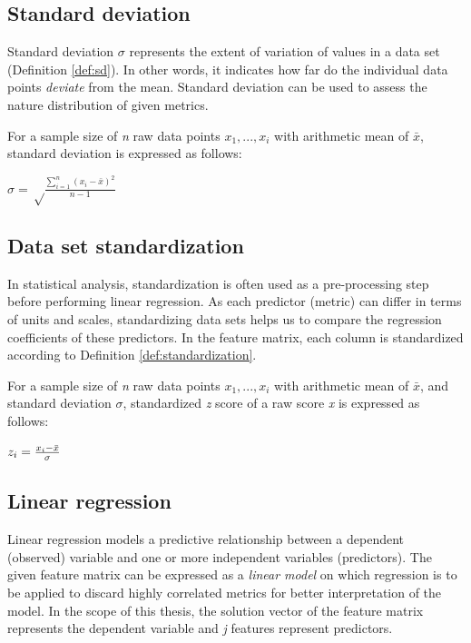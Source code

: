 \subsection*{Standard deviation}
Standard deviation $\sigma$ represents the extent of variation of values in a data set (Definition \ref{def:sd}). In other words, it indicates how far do the individual data points \textit{deviate} from the mean. Standard deviation can be used to assess the nature distribution of given metrics. 
\theoremstyle{definition}
\begin{definition}{For a sample size of \textit{n} raw data points \textit{$x_1,...,x_i$} with arithmetic mean of $\bar{x}$, standard deviation is expressed as follows:  }
\begin{center}\Large
$\sigma = \sqrt\frac{\sum\limits_{i=1}^{n}(x_i - \bar{x})^2} {n - 1}$
\label{def:sd}
\end{center}
\end{definition}

\subsection*{Data set standardization}
In statistical analysis, standardization is often used as a pre-processing step before performing linear regression. As each predictor (metric) can differ in terms of units and scales, standardizing data sets helps us to compare the regression coefficients of these predictors. In the feature matrix, each column is standardized according to Definition \ref{def:standardization}.

\theoremstyle{definition}
\begin{definition}{For a sample size of \textit{n} raw data points \textit{$x_1,...,x_i$} with arithmetic mean of $\bar{x}$, and standard deviation $\sigma$, standardized \textit{z} score of a raw score \textit{x} is expressed as follows: }
\begin{center}\Large
$z_{i} = {x_{i}- \bar{x} \over \sigma}$
\label{def:standardization}
\end{center}
\end{definition}

\subsection*{Linear regression}

Linear regression models a predictive relationship between a dependent (observed) variable and one or more independent variables (predictors). The given feature matrix can be expressed as a \textit{linear model} on which regression is to be applied to discard highly correlated metrics for better interpretation of the model. In the scope of this thesis, the solution vector of the feature matrix represents the dependent variable and \textit{j} features represent predictors. 

